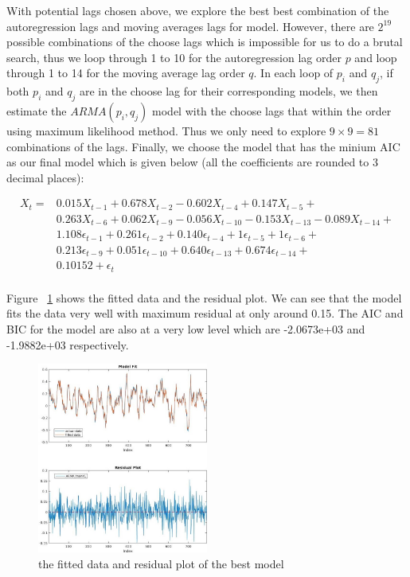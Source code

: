 \documentclass{article}
\begin{document}
With potential lags chosen above, we explore the best best combination of the autoregression lags and moving averages lags for model. However, there are $2^{19}$ possible combinations of the choose lags which is impossible for us to do a brutal search, thus we loop through 1 to 10 for the autoregression lag order $p$ and loop through 1 to 14 for the moving average lag order $q$. In each loop of $p_i$ and $q_j$, if both $p_i$ and $q_j$ are in the choose lag for their corresponding models, we then estimate the $ARMA(p_i, q_j)$ model with the choose lags that within the order using maximum likelihood method. Thus we only need to explore $9\times9=81$ combinations of the lags. Finally, we choose the model that has the minium AIC as our final model which is given below (all the coefficients are rounded to 3 decimal places):

\begin{align*}
    X_t=&0.015X_{t-1}+0.678X_{t-2}-0.602X_{t-4}+0.147X_{t-5}+\\
        &0.263X_{t-6}+0.062X_{t-9}-0.056X_{t-10}-0.153X_{t-13}-0.089X_{t-14}+\\
        &1.108\epsilon_{t-1}+0.261\epsilon_{t-2}+0.140\epsilon_{t-4}+1\epsilon_{t-5}+1\epsilon_{t-6}+\\
        &0.213\epsilon_{t-9}+0.051\epsilon_{t-10}+0.640\epsilon_{t-13}+0.674\epsilon_{t-14}+\\
        &0.10152+\epsilon_t\\
\end{align*}

Figure ~\ref{fig:fit} shows the fitted data and the residual plot. We can see that the model fits the data very well with maximum residual at only around 0.15. The AIC and BIC for the model are also at a very low level which are -2.0673e+03 and -1.9882e+03 respectively.

\begin{figure}[h!]
    \centering
    \includegraphics[width=0.5\textwidth]{fit.jpg}
    \caption{the fitted data and residual plot of the best model}
    \label{fig:fit}
\end{figure}
\end{document}
